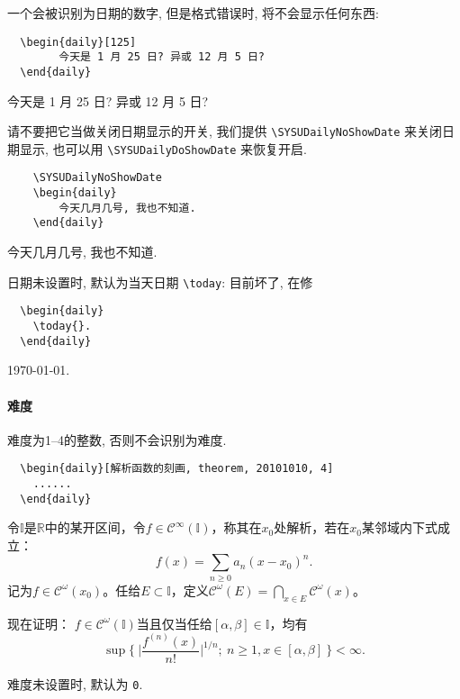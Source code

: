 \documentclass{SYSUDaily}
\begin{document}
一个会被识别为日期的数字, 但是格式错误时, 将不会显示任何东西:
\begin{multicols}{2}
	\begin{lstlisting}
  \begin{daily}[125]
		今天是 1 月 25 日? 异或 12 月 5 日?
  \end{daily}
  \end{lstlisting}
	\small
	\begin{daily}[125]
		今天是 1 月 25 日? 异或 12 月 5 日?
	\end{daily}
\end{multicols}
请不要把它当做关闭日期显示的开关, 我们提供 \verb|\SYSUDailyNoShowDate| 来关闭日期显示, 也可以用 \verb|\SYSUDailyDoShowDate| 来恢复开启.
\begin{multicols}{2}
	\begin{lstlisting}
	\SYSUDailyNoShowDate
	\begin{daily}
		今天几月几号, 我也不知道.
	\end{daily}
  \end{lstlisting}
	\small
	\begin{daily}
		今天几月几号, 我也不知道.
	\end{daily}
\end{multicols}
\SYSUDailyDoShowDate
日期未设置时, 默认为当天日期 \verb|\today|: 目前坏了, 在修

\begin{multicols}{2}
	\begin{lstlisting}
  \begin{daily}
    \today{}.
  \end{daily}
  \end{lstlisting}
	\small
	\begin{daily}
		\today{}.
	\end{daily}
\end{multicols}



\paragraph{难度}
难度为1--4的整数, 否则不会识别为难度.
\begin{lstlisting}
  \begin{daily}[解析函数的刻画, theorem, 20101010, 4]
    ......
  \end{daily}
\end{lstlisting}
\begin{daily}
	令$\mathbb I$是$\mathbb R$中的某开区间，令$f\in \mathscr{C}^\infty(\mathbb  I)$，称其在$x_0$处解析，若在$x_0$某邻域内下式成立：
	$$
	f(x) = \sum_{n\geqslant0} a_n(x-x_0)^n.
	$$
	记为$f\in \mathscr{C}^\omega(x_0)$。任给$E\subset \mathbb I$，定义$\mathscr{C}^\omega(E)=\bigcap_{x\in E}\mathscr{C}^\omega(x)$。

	现在证明：
	$f\in \mathscr{C}^\omega(\mathbb I)$当且仅当任给$[\alpha,\beta]\in \mathbb I$，均有
	\[
			\sup\biggl\{~\biggl| \frac{f^{(n)}(x)}{n!} \biggr|^{1/n}\!;~n\geqslant 1, x\in [\alpha,\beta] ~\biggr\}   <\infty.
	\]
\end{daily}
难度未设置时, 默认为 \verb|0|.
\end{document}
